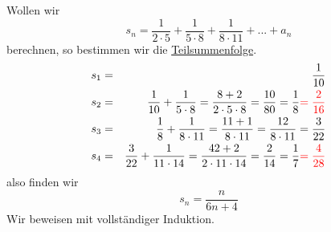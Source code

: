 \documentclass[a4paper,10pt]{report}
\begin{document}
Wollen wir
\begin{equation*}s_n = \frac{1}{2 \cdot 5} + \frac{1}{5 \cdot 8} + \frac{1}{8 \cdot 11} + ... + a_n\end{equation*}
berechnen, so bestimmen wir die \underline{Teilsummenfolge}.
\begin{eqnarray}s_1 & = & \frac{1}{10}\\
s_2 & = & \frac{1}{10} + \frac{1}{5 \cdot 8} = \frac{8 + 2}{2 \cdot 5 \cdot 8} = \frac{10}{80} = \frac{1}{8} \textcolor{red}{ = \frac{2}{16}}\\
s_3 & = & \frac{1}{8} + \frac{1}{8 \cdot 11} = \frac{11 + 1}{8 \cdot 11} = \frac{12}{8 \cdot 11} = \frac{3}{22}\\
s_4 & = & \frac{3}{22} + \frac{1}{11 \cdot 14} = \frac{42 + 2}{2 \cdot 11 \cdot 14} = \frac{2}{14} = \frac{1}{7} \textcolor{red}{ = \frac{4}{28}}\end{eqnarray}
also finden wir
\begin{equation*}s_n = \frac{n}{6n + 4}\end{equation*}
Wir beweisen mit vollständiger Induktion.
\end{document}
